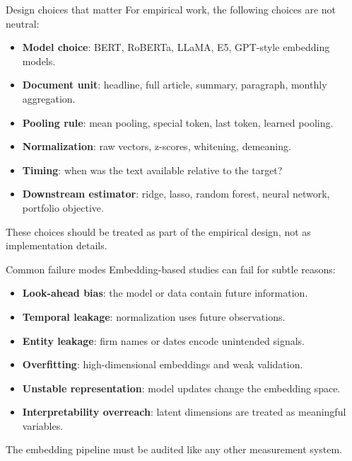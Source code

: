 \documentclass[aspectratio=169]{beamer}
\begin{document}
\begin{frame}{Design choices that matter}
\large
For empirical work, the following choices are not neutral:

\vspace{0.2cm}

\begin{itemize}
  \item \textbf{Model choice}: BERT, RoBERTa, LLaMA, E5, GPT-style embedding models.
  \item \textbf{Document unit}: headline, full article, summary, paragraph, monthly aggregation.
  \item \textbf{Pooling rule}: mean pooling, special token, last token, learned pooling.
  \item \textbf{Normalization}: raw vectors, z-scores, whitening, demeaning.
  \item \textbf{Timing}: when was the text available relative to the target?
  \item \textbf{Downstream estimator}: ridge, lasso, random forest, neural network, portfolio objective.
\end{itemize}

\vspace{0.15cm}

These choices should be treated as part of the empirical design, not as implementation details.
\end{frame}

\begin{frame}{Common failure modes}
\large
Embedding-based studies can fail for subtle reasons:

\vspace{0.2cm}

\begin{itemize}
  \item \textbf{Look-ahead bias}: the model or data contain future information.
  \item \textbf{Temporal leakage}: normalization uses future observations.
  \item \textbf{Entity leakage}: firm names or dates encode unintended signals.
  \item \textbf{Overfitting}: high-dimensional embeddings and weak validation.
  \item \textbf{Unstable representation}: model updates change the embedding space.
  \item \textbf{Interpretability overreach}: latent dimensions are treated as meaningful variables.
\end{itemize}

\vspace{0.2cm}

\begin{redbox}
The embedding pipeline must be audited like any other measurement system.
\end{redbox}
\end{frame}
\end{document}
